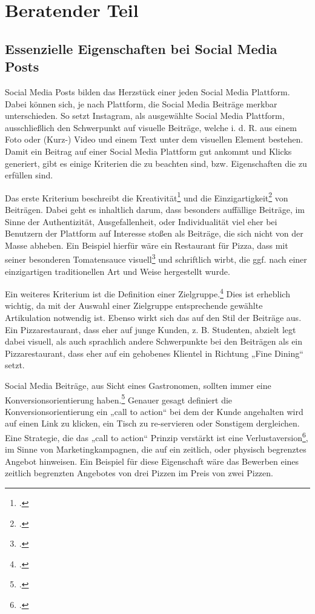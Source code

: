 \newpage
\section{Beratender Teil} \label{sec:beratender-teil}

\subsection{Essenzielle Eigenschaften bei Social Media Posts}
Social Media Posts bilden das Herzstück einer jeden Social Media Plattform.
Dabei können sich, je nach Plattform, die Social Media Beiträge merkbar unterschieden.
So setzt Instagram, als ausgewählte Social Media Plattform, ausschließlich den Schwerpunkt auf visuelle Beiträge, welche i. d. R. aus einem Foto oder (Kurz-) Video und einem Text unter dem visuellen Element bestehen.
Damit ein Beitrag auf einer Social Media Plattform gut ankommt und Klicks generiert, gibt es einige Kriterien die zu beachten sind, bzw. Eigenschaften die zu erfüllen sind.

Das erste Kriterium beschreibt die Kreativität\footcite{kaplan_users_2010} und die Einzigartigkeit\footcite{keller_building_1993} von Beiträgen.
Dabei geht es inhaltlich darum, dass besonders auffällige Beiträge, im Sinne der Authentizität, Ausgefallenheit, oder Individualität viel eher bei Benutzern der Plattform auf Interesse stoßen als Beiträge, die sich nicht von der Masse abheben.
Ein Beispiel hierfür wäre ein Restaurant für Pizza, dass mit seiner besonderen Tomatensauce visuell\footcite{green_role_2000} und schriftlich wirbt, die ggf. nach einer einzigartigen traditionellen Art und Weise hergestellt wurde.

Ein weiteres Kriterium ist die Definition einer Zielgruppe.\footcite{kotler_marketing_management}
Dies ist erheblich wichtig, da mit der Auswahl einer Zielgruppe entsprechende gewählte Artikulation notwendig ist.
Ebenso wirkt sich das auf den Stil der Beiträge aus.
Ein Pizzarestaurant, dass eher auf junge Kunden, z. B. Studenten, abzielt legt dabei visuell, als auch sprachlich andere Schwerpunkte bei den Beiträgen als ein Pizzarestaurant, dass eher auf ein gehobenes Klientel in Richtung „Fine Dining“ setzt.

Social Media Beiträge, aus Sicht eines Gastronomen, sollten immer eine Konversionsorientierung haben.\footcite{website_quality_customer_satisfaction}
Genauer gesagt definiert die Konversionsorientierung ein „call to action“ bei dem der Kunde angehalten wird auf einen Link zu klicken, ein Tisch zu re-servieren oder Sonstigem dergleichen.
Eine Strategie, die das „call to action“ Prinzip verstärkt ist eine Verlustaversion\footcite{jstor_example}, im Sinne von Marketingkampagnen, die auf ein zeitlich, oder physisch begrenztes Angebot hinweisen.
Ein Beispiel für diese Eigenschaft wäre das Bewerben eines zeitlich begrenzten Angebotes von drei Pizzen im Preis von zwei Pizzen.

